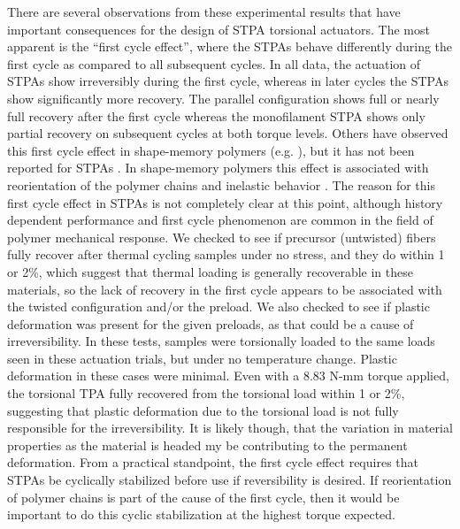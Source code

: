 \documentclass[twocolumn,10pt]{asme2e}
\begin{document}
There are several observations from these experimental results that have important consequences for the design of STPA torsional actuators.  The most apparent is the ``first cycle effect'', where the STPAs behave differently during the first cycle as compared to all subsequent cycles.  In all data, the actuation of STPAs show irreversibly during the first cycle,  whereas in later cycles the STPAs show significantly more recovery.  The parallel configuration shows full or nearly full recovery after the first cycle whereas the monofilament STPA shows only partial recovery on subsequent cycles at both torque levels.  %
Others have observed this first cycle effect in shape-memory polymers (e.g. \cite{lendlein_biodegradable}), but it has not been reported for STPAs \cite{aziz_controlled}.  In shape-memory polymers this effect is associated with reorientation of the polymer chains and inelastic behavior \cite{lendlein_biodegradable}.
The reason for this first cycle effect in STPAs is not completely clear at this point, although history dependent performance and first cycle phenomenon are common in the field of polymer mechanical response. We checked to see if precursor (untwisted) fibers fully recover after thermal cycling samples  under no stress, and they do within 1 or 2\%, which suggest that thermal loading is generally recoverable in these materials, so the lack of recovery in the first cycle appears to be associated with the twisted configuration and/or the preload. We also checked to see if plastic deformation was present for the given preloads, as that could be a cause of irreversibility. In these tests, samples were torsionally loaded to the same loads seen in these actuation trials, but under no temperature change. Plastic deformation in these cases were minimal. Even with a 8.83 N-mm torque applied, the torsional TPA fully recovered from the torsional load within 1 or 2\%, suggesting that plastic deformation due to the torsional load is not fully responsible for the irreversibility. It is likely though, that the variation in material properties as the material is headed my be contributing to the permanent deformation. From a practical standpoint, the first cycle effect requires that STPAs be cyclically stabilized before use if reversibility is desired. If reorientation of polymer chains is part of the cause of the first cycle, then it would be important to do this cyclic stabilization at the highest torque expected.  
\end{document}
